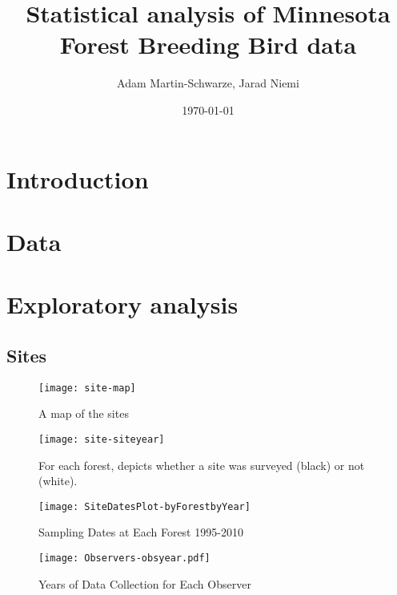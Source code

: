 \documentclass{article}
\title{Statistical analysis of Minnesota Forest Breeding Bird data}
\author{Adam Martin-Schwarze, Jarad Niemi}
\date{\today}
\begin{document}
\maketitle
\tableofcontents
\newpage


\section{Introduction}



\section{Data} 



\section{Exploratory analysis}

\subsection{Sites}






\begin{figure}
\texttt{[image: site-map]}
\caption{A map of the sites}
\label{fig:site-map}
\end{figure}


\begin{figure}
\texttt{[image: site-siteyear]}
\caption{For each forest, depicts whether a site was surveyed (black) or not (white).}
\label{fig:site-siteyear}
\end{figure}


\begin{figure}
\texttt{[image: SiteDatesPlot-byForestbyYear]}
\caption{Sampling Dates at Each Forest 1995-2010}
\label{fig:SiteDatesPlot-byForestbyYear}
\end{figure}


\begin{figure}
\texttt{[image: Observers-obsyear.pdf]}
\caption{Years of Data Collection for Each Observer}
\label{fig:Observers-obsyear}
\end{figure}
\end{document}
